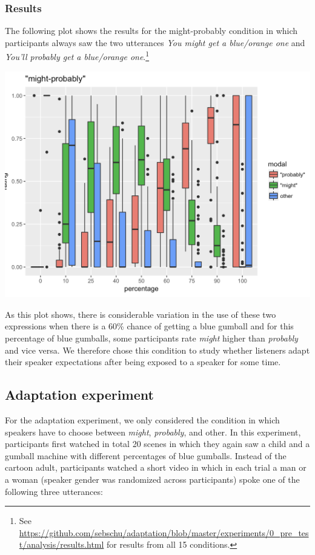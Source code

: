 \documentclass[lucida,biblatex]{sp} %
\begin{document}
\subsubsection{Results}

The following plot shows the results for the might-probably condition in which participants always saw the two utterances \textit{You might get a blue/orange one} and  \textit{You'll probably get a blue/orange one}.\footnote{See \url{https://github.com/sebschu/adaptation/blob/master/experiments/0_pre_test/analysis/results.html} for results from all 15 conditions.} 

\begin{center}
\includegraphics[width=\textwidth]{figures/pre-test-results.png}
\vspace{2em}
\end{center}

As this plot shows, there is considerable variation in the use of these two expressions when there is a 60\% chance of getting a blue gumball and for this percentage of blue gumballs, some participants rate \textit{might} higher than \textit{probably} and vice versa. We therefore chose this condition to study whether listeners adapt their speaker expectations after being exposed to a speaker for some time.


\subsection{Adaptation experiment}

For the adaptation experiment, we only considered the condition in which speakers have to choose between \textit{might}, \textit{probably}, and other. In this experiment, participants first watched in total 20 scenes in which they again saw a child and a gumball machine with different percentages of blue gumballs. Instead of the cartoon adult, participants watched a short video in which in each trial a man or a woman (speaker gender was randomized across participants) spoke one of the following three utterances:
\end{document}
